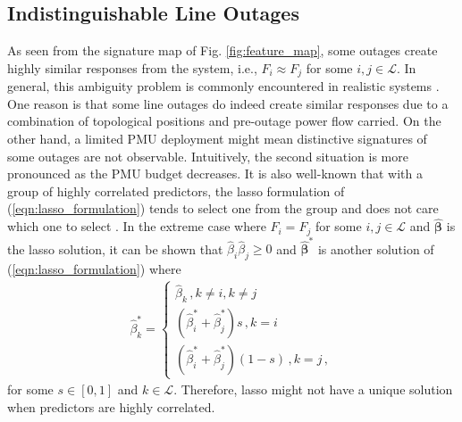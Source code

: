\subsection{Indistinguishable Line Outages}
\label{sec:diagnosability}
As seen from the signature map of Fig. \ref{fig:feature_map}, some outages  create highly similar responses from the system, i.e., $F_i \approx F_j$ for some $i,j \in \mathcal{L}$. In general, this ambiguity problem is commonly encountered in realistic systems \cite{Wu2015}. One reason is that some line outages do indeed create similar responses due to a combination of topological positions and pre-outage power flow carried. On the other hand, a limited PMU deployment might mean distinctive signatures of some outages are not observable. Intuitively, the second situation is more pronounced as the PMU budget decreases. It is also well-known that with a group of highly correlated predictors, the lasso formulation of (\ref{eqn:lasso_formulation}) tends to select one from the group and does not care which one to select \cite{zou2005regularization}. In the extreme case where $F_{i} = F_{j}$ for some $i,j \in \mathcal{L}$ and $\boldsymbol{\hat{\beta}}$ is the lasso solution, it can be shown that $\hat{\beta}_{i}\hat{\beta}_{j} \ge 0 $ and $\boldsymbol{\hat{\beta}}^*$ is another solution of (\ref{eqn:lasso_formulation}) where
\begin{align}
\hat{\beta}^*_k = 
\begin{cases}
\hat{\beta}_k \,,  k \ne i, k \ne j \\
(\hat{\beta}^*_{i}+\hat{\beta}^*_{j}) s \,, k=i \\
(\hat{\beta}^*_{i}+\hat{\beta}^*_{j}) (1-s) \,, k=j \,,
\end{cases}
\end{align}
for some $s \in [0, 1]$ and $k \in \mathcal{L}$. Therefore, lasso might not have a unique solution when predictors are highly correlated.

